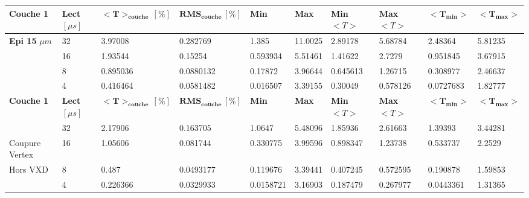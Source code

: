\begin{table}
\begin{tabular}{|l|l|l|l|l|l|l|l|l|l|}
\textbf{Couche 1} & \textbf{Lect} $[\mu s]$ & $\mathbf{<T>_{couche} \, [\%]}$ & $\mathbf{RMS_{couche} \, [\%]}$ & \textbf{Min} & \textbf{Max} & \textbf{Min} $<T>$ & \textbf{Max} $<T>$ & $\mathbf{<T_{min}>}$ & $\mathbf{<T_{max}>}$ \\ \hline
  \textbf{Epi 15} $\mu m$     & 32            & 3.97008                  & 0.282769                & 1.385     & 11.0025   & 2.89178       & 5.68784       & 2.48364         & 5.81235         \\ \hline
                              & 16            & 1.93544                  & 0.15254                 & 0.593934  & 5.51461   & 1.41622       & 2.7279        & 0.951845        & 3.67915         \\ \hline
                              & 8             & 0.895036                 & 0.0880132               & 0.17872   & 3.96644   & 0.645613      & 1.26715       & 0.308977        & 2.46637         \\ \hline
                              & 4             & 0.416464                 & 0.0581482               & 0.016507  & 3.39155   & 0.30049       & 0.578126      & 0.0727683       & 1.82777         \\ \hline
\textbf{Couche 1} & \textbf{Lect} $[\mu s]$ & $\mathbf{<T>_{couche} \, [\%]}$ & $\mathbf{RMS_{couche} \, [\%]}$ & \textbf{Min} & \textbf{Max} & \textbf{Min} $<T>$ & \textbf{Max} $<T>$ & $\mathbf{<T_{min}>}$ & $\mathbf{<T_{max}>}$ \\ \hline
                              & 32            & 2.17906                  & 0.163705                & 1.0647    & 5.48096   & 1.85936       & 2.61663       & 1.39393         & 3.44281         \\ \hline
Coupure Vertex                & 16            & 1.05606                  & 0.081744                & 0.330775  & 3.99596   & 0.898347      & 1.23738       & 0.533737        & 2.2529          \\ \hline
Hors VXD                      & 8             & 0.487                    & 0.0493177               & 0.119676  & 3.39441   & 0.407245      & 0.572595      & 0.190878        & 1.59853         \\ \hline
                              & 4             & 0.226366                 & 0.0329933               & 0.0158721 & 3.16903   & 0.187479      & 0.267977      & 0.0443361       & 1.31365         \\ \hline
\end{tabular}

\end{table}
